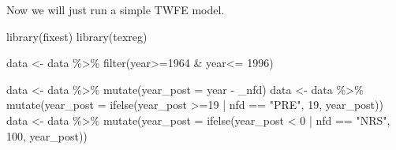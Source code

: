 \documentclass[
  letterpaper,
  DIV=11,
  numbers=noendperiod]{scrartcl}
\newenvironment{Shaded}{\begin{snugshade}}{\end{snugshade}}
\newcommand{\AttributeTok}[1]{\textcolor[rgb]{0.40,0.45,0.13}{#1}}
\newcommand{\DecValTok}[1]{\textcolor[rgb]{0.68,0.00,0.00}{#1}}
\newcommand{\FunctionTok}[1]{\textcolor[rgb]{0.28,0.35,0.67}{#1}}
\newcommand{\NormalTok}[1]{\textcolor[rgb]{0.00,0.23,0.31}{#1}}
\newcommand{\OtherTok}[1]{\textcolor[rgb]{0.00,0.23,0.31}{#1}}
\newcommand{\SpecialCharTok}[1]{\textcolor[rgb]{0.37,0.37,0.37}{#1}}
\newcommand{\StringTok}[1]{\textcolor[rgb]{0.13,0.47,0.30}{#1}}
\begin{document}
Now we will just run a simple TWFE model.

\begin{Shaded}
\begin{Highlighting}[]
\FunctionTok{library}\NormalTok{(fixest) }
\FunctionTok{library}\NormalTok{(texreg)}

\NormalTok{data }\OtherTok{\textless{}{-}}\NormalTok{ data }\SpecialCharTok{\%\textgreater{}\%} \FunctionTok{filter}\NormalTok{(year}\SpecialCharTok{\textgreater{}=}\DecValTok{1964} \SpecialCharTok{\&}\NormalTok{ year}\SpecialCharTok{\textless{}=} \DecValTok{1996}\NormalTok{)}

\NormalTok{data }\OtherTok{\textless{}{-}}\NormalTok{ data }\SpecialCharTok{\%\textgreater{}\%} \FunctionTok{mutate}\NormalTok{(}\AttributeTok{year\_post =}\NormalTok{ year }\SpecialCharTok{{-}} \StringTok{\textasciigrave{}}\AttributeTok{\_nfd}\StringTok{\textasciigrave{}}\NormalTok{)}
\NormalTok{data }\OtherTok{\textless{}{-}}\NormalTok{ data }\SpecialCharTok{\%\textgreater{}\%} \FunctionTok{mutate}\NormalTok{(}\AttributeTok{year\_post =} \FunctionTok{ifelse}\NormalTok{(year\_post }\SpecialCharTok{\textgreater{}=}\DecValTok{19} \SpecialCharTok{|}\NormalTok{ nfd }\SpecialCharTok{==} \StringTok{"PRE"}\NormalTok{, }\DecValTok{19}\NormalTok{, year\_post))}
\NormalTok{data }\OtherTok{\textless{}{-}}\NormalTok{ data }\SpecialCharTok{\%\textgreater{}\%} \FunctionTok{mutate}\NormalTok{(}\AttributeTok{year\_post =} \FunctionTok{ifelse}\NormalTok{(year\_post }\SpecialCharTok{\textless{}} \DecValTok{0} \SpecialCharTok{|}\NormalTok{ nfd }\SpecialCharTok{==} \StringTok{"NRS"}\NormalTok{, }\DecValTok{100}\NormalTok{, year\_post))}


\end{Highlighting}
\end{Shaded}
\end{document}
